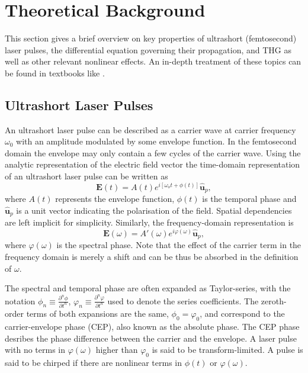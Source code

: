 \documentclass[a4paper]{jpconf}
\begin{document}
\section{Theoretical Background}
This section gives a brief overview on key properties of ultrashort (femtosecond) laser pulses, the differential equation governing their propagation, and THG as well as other relevant nonlinear effects. An in-depth treatment of these topics can be found in textbooks like \cite{keller2021, new2011}. 

\subsection{Ultrashort Laser Pulses}
An ultrashort laser pulse can be described as a carrier wave at carrier frequency $\omega_0$ with an amplitude modulated by some envelope function. In the femtosecond domain the envelope may only contain a few cycles of the carrier wave. Using the analytic representation of the electric field vector the time-domain representation of an ultrashort laser pulse can be written as 
\begin{equation}
\mathbf{E}(t) = A(t) e^{i[ \omega_o t + \phi(t)]} \hat{\mathbf{u}}_p,
\end{equation}
where $A(t)$ represents the envelope function, $\phi(t)$ is the temporal phase and $\hat{\mathbf{u}}_p$ is a unit vector indicating the polarisation of the field. Spatial dependencies are left implicit for simplicity. Similarly, the frequency-domain representation is 
\begin{equation}
\mathbf{E}(\omega) = A'(\omega) e^{i \varphi(\omega)} \hat{\mathbf{u}}_p,
\end{equation}
where $\varphi(\omega)$ is the spectral phase. Note that the effect of the carrier term in the frequency domain is merely a shift and can be thus be absorbed in the definition of $\omega$. \par 
The spectral and temporal phase are often expanded as Taylor-series, with the notation $\phi_n \equiv \frac{\partial^n \phi}{\partial t^n}$, $\varphi_n \equiv \frac{\partial^n \varphi}{\partial t^n}$ used to denote the series coefficients. The zeroth-order terms of both expansions are the same, $\phi_0 = \varphi_0$, and correspond to the carrier-envelope phase (CEP), also known as the absolute phase. The CEP phase desribes the phase difference between the carrier and the envelope. A laser pulse with no terms in $\varphi(\omega)$ higher than $\varphi_0$ is said to be transform-limited. A pulse is said to be chirped if there are nonlinear terms in $\phi(t)$ or $\varphi(\omega)$. \par 
\end{document}
